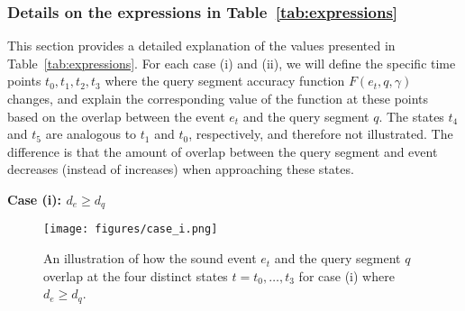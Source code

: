 

\subsubsection{Details on the expressions in Table~\ref{tab:expressions}}
\label{app:details_on_expressions}

This section provides a detailed explanation of the values presented in Table~\ref{tab:expressions}. For each case (i) and (ii), we will define the specific time points  $t_0, t_1, t_2, t_3$ where the query segment accuracy function $F(e_t, q, \gamma)$ changes, and explain the corresponding value of the function at these points based on the overlap between the event $e_t$ and the query segment $q$. The states $t_4$ and $t_5$ are analogous to $t_1$ and $t_0$, respectively, and therefore not illustrated. The difference is that the amount of overlap between the query segment and event decreases (instead of increases) when approaching these states.

\textbf{Case (i): $d_e \geq d_q$}

\begin{figure}[H]
    \centering
    \texttt{[image: figures/case\_i.png]}
    \caption{An illustration of how the sound event $e_t$ and the query segment $q$ overlap at the four distinct states $t = t_0, \dots, t_3$ for case (i) where $d_e \geq d_q$.}
    \label{fig:case_i}
\end{figure}

